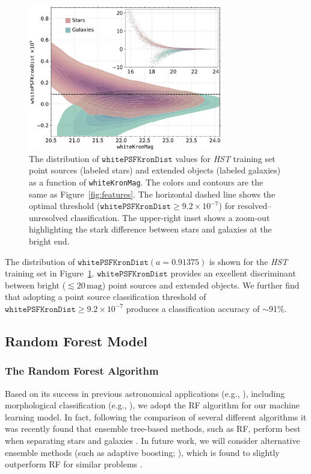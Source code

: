 \documentclass[twocolumn, dvipdfmx]{aastex62}
\begin{document}
\begin{CJK*}{UTF8}{gbsn}
\begin{figure}[t]
 \centering
  \includegraphics[width=3.35in]{./Figures/whitePSFKronDist.pdf}
  \caption{ The distribution of $\mathtt{whitePSFKronDist}$ values for
  \textit{HST} training set point sources (labeled stars) and extended
  objects (labeled galaxies) as a function of \texttt{whiteKronMag}. The
  colors and contours are the same as Figure~\ref{fig:features}. The
  horizontal dashed line shows the optimal threshold
  ($\mathtt{whitePSFKronDist} \ge 9.2 \times 10^{-7}$) for
  resolved--unresolved classification. The upper-right inset shows a
  zoom-out highlighting the stark difference between stars and galaxies at
  the bright end. }
  \label{fig:psfkrondist}
\end{figure}

The distribution of $\mathtt{whitePSFKronDist}(a=0.91375)$ is shown for the
\textit{HST} training set in Figure~\ref{fig:psfkrondist}.
$\mathtt{whitePSFKronDist}$ provides an excellent discriminant between
bright ($\lesssim 20\,\mathrm{mag}$) point sources and extended objects. We
further find that adopting a point source classification threshold of
$\mathtt{whitePSFKronDist} \ge 9.2 \times 10^{-7}$ produces a classification
accuracy of $\sim$91\%.

\subsection{Random Forest Model}\label{sec:rf_model}

\subsubsection{The Random Forest Algorithm}\label{sec:rf_alg}

Based on its success in previous astronomical applications (e.g.,
\citealt{Richards12a, Huppenkothen17, Brink13, Wright15, Goldstein15}),
including morphological classification (e.g., \citealt{Vasconcellos11,Miller17}),
we adopt the RF algorithm \citep{Breiman01} for our machine learning model.
In fact, following the comparison of several different algorithms it was
recently found that ensemble tree-based methods, such as RF, perform best
when separating stars and galaxies \citep{Sevilla18}. In future work, we
will consider alternative ensemble methods (such as adaptive boosting;
\citealt{Freund97}), which is found to slightly outperform RF for
similar problems \citep{Sevilla18}.


\end{CJK*}
\end{document}
